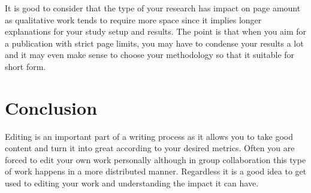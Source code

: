 It is good to consider that the type of your research has impact on page amount as qualitative work tends to require more space since it implies longer explanations for your study setup and results.
The point is that when you aim for a publication with strict page limits, you may have to condense your results a lot and it may even make sense to choose your methodology so that it suitable for short form.

\section{Conclusion}

Editing is an important part of a writing process as it allows you to take good content and turn it into great according to your desired metrics.
Often you are forced to edit your own work personally although in group collaboration this type of work happens in a more distributed manner.
Regardless it is a good idea to get used to editing your work and understanding the impact it can have.
